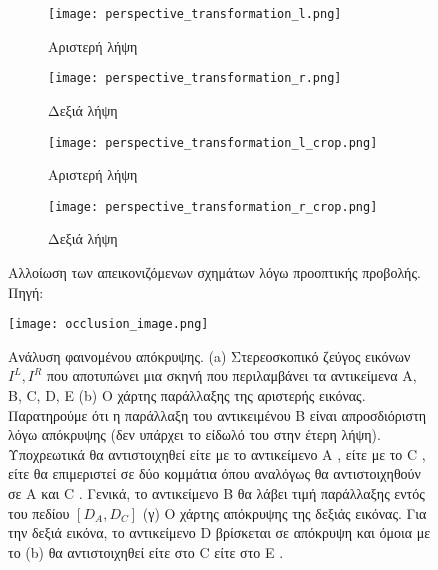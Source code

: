 \begin{figure}
	\centering
	\begin{subfigure}{.49\textwidth}
		\texttt{[image: perspective\_transformation\_l.png]}
		\caption{Αριστερή λήψη}
	\end{subfigure}
	\begin{subfigure}{.49\textwidth}
		\texttt{[image: perspective\_transformation\_r.png]}
		\caption{Δεξιά λήψη}
	\end{subfigure}
	
	\begin{subfigure}{.49\textwidth}
		\texttt{[image: perspective\_transformation\_l\_crop.png]}
		\caption{Αριστερή λήψη}
	\end{subfigure}
	\begin{subfigure}{.49\textwidth}
		\texttt{[image: perspective\_transformation\_r\_crop.png]}
		\caption{Δεξιά λήψη}
	\end{subfigure}
	\caption{Αλλοίωση των απεικονιζόμενων σχημάτων λόγω προοπτικής προβολής. Πηγή: \citep{TUMLesson}}
	\label{fig:perspective_transformation}
\end{figure}

\begin{figure}
	\centering
	\texttt{[image: occlusion\_image.png]}
	\caption{Ανάλυση φαινομένου απόκρυψης. (a) Στερεοσκοπικό ζεύγος εικόνων $I^L, I^R$ που αποτυπώνει μια σκηνή που περιλαμβάνει τα αντικείμενα \e A, B, C, D, E \g (b) Ο χάρτης παράλλαξης της αριστερής εικόνας. Παρατηρούμε ότι η παράλλαξη του αντικειμένου \e B \g είναι απροσδιόριστη λόγω απόκρυψης (δεν υπάρχει το είδωλό του στην έτερη λήψη). Υποχρεωτικά θα αντιστοιχηθεί είτε με το αντικείμενο \e A \g, είτε με το \e C \g, είτε θα επιμεριστεί σε δύο κομμάτια όπου αναλόγως θα αντιστοιχηθούν σε \e A \g και \e C \g. Γενικά, το αντικείμενο \e B \g θα λάβει τιμή παράλλαξης εντός του πεδίου $[D_A, D_C]$ (γ) Ο χάρτης απόκρυψης της δεξιάς εικόνας. Για την δεξιά εικόνα, το αντικείμενο \e D \g βρίσκεται σε απόκρυψη και όμοια με το (b) θα αντιστοιχηθεί είτε στο \e C \g είτε στο \e E \g.}
	\label{fig:occlusion}
\end{figure}

